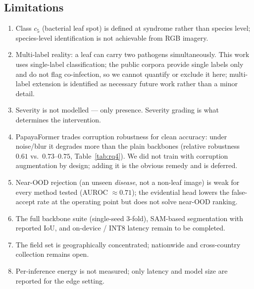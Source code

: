 \documentclass[10pt,twocolumn,a4paper]{article}
\begin{document}
\subsection{Limitations}
\begin{enumerate}[leftmargin=1.3em,itemsep=1pt,topsep=2pt]
\item Class $c_5$ (bacterial leaf spot) is defined at syndrome rather than species level; species-level identification is not achievable from RGB imagery.
\item Multi-label reality: a leaf can carry two pathogens simultaneously. This work uses single-label classification; the public corpora provide single labels only and do not flag co-infection, so we cannot quantify or exclude it here; multi-label extension is identified as necessary future work rather than a minor detail.
\item Severity is not modelled --- only presence. Severity grading is what determines the intervention.
\item PapayaFormer trades corruption robustness for clean accuracy: under noise/blur it degrades more than the plain backbones (relative robustness $0.61$ vs.\ $0.73$--$0.75$, Table~\ref{tab:rq4}). We did not train with corruption augmentation by design; adding it is the obvious remedy and is deferred.
\item Near-OOD rejection (an unseen \emph{disease}, not a non-leaf image) is weak for every method tested (AUROC $\approx0.71$); the evidential head lowers the false-accept rate at the operating point but does not solve near-OOD ranking.
\item The full backbone suite (single-seed 3-fold), SAM-based segmentation with reported IoU, and on-device / INT8 latency remain to be completed.
\item The field set is geographically concentrated; nationwide and cross-country collection remains open.
\item Per-inference energy is not measured; only latency and model size are reported for the edge setting.
\end{enumerate}

\end{document}
